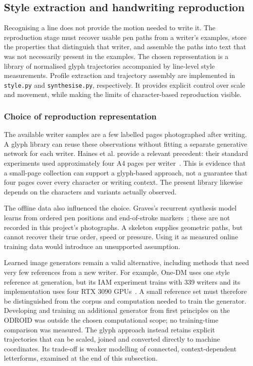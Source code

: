 \subsection{Style extraction and handwriting reproduction}
\label{sec:des-reproduction}
Recognising a line does not provide the motion needed to write it. The reproduction stage must recover usable pen paths from a writer's examples, store the properties that distinguish that writer, and assemble the paths into text that was not necessarily present in the examples. The chosen representation is a library of normalised glyph trajectories accompanied by line-level style measurements. Profile extraction and trajectory assembly are implemented in \texttt{style.py} and \texttt{synthesise.py}, respectively. It provides explicit control over scale and movement, while making the limits of character-based reproduction visible.


\subsubsection{Choice of reproduction representation}
The available writer samples are a few labelled pages photographed after writing. A glyph library can reuse these observations without fitting a separate generative network for each writer. Haines et al. provide a relevant precedent: their standard experiments used approximately four A4 pages per writer~\cite[PDF p.~4, Sec.~4]{haines2016}. This is evidence that a small-page collection can support a glyph-based approach, not a guarantee that four pages cover every character or writing context. The present library likewise depends on the characters and variants actually observed.

The offline data also influenced the choice. Graves's recurrent synthesis model learns from ordered pen positions and end-of-stroke markers~\cite[p.~18]{graves2013}; these are not recorded in this project's photographs. A skeleton supplies geometric paths, but cannot recover their true order, speed or pressure. Using it as measured online training data would introduce an unsupported assumption.

Learned image generators remain a valid alternative, including methods that need very few references from a new writer. For example, One-DM uses one style reference at generation, but its IAM experiment trains with 339 writers and its implementation uses four RTX 3090 GPUs~\cite[p.~9]{dai2024}. A small reference set must therefore be distinguished from the corpus and computation needed to train the generator. Developing and training an additional generator from first principles on the ODROID was outside the chosen computational scope; no training-time comparison was measured. The glyph approach instead retains explicit trajectories that can be scaled, joined and converted directly to machine coordinates. Its trade-off is weaker modelling of connected, context-dependent letterforms, examined at the end of this subsection.

